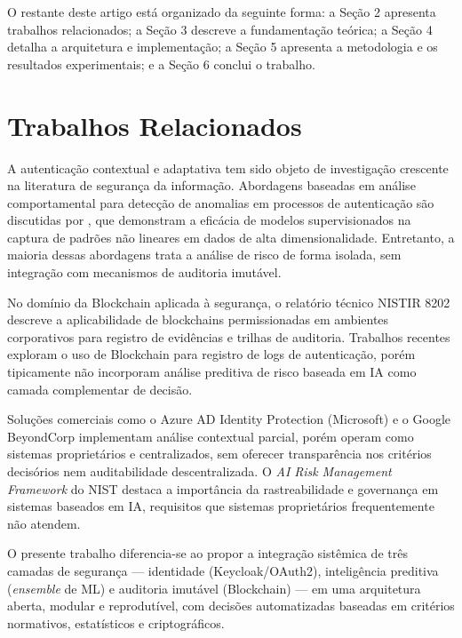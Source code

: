 \documentclass[12pt]{article}
\begin{document}
O restante deste artigo está organizado da seguinte forma: a Seção 2 apresenta trabalhos relacionados; a Seção 3 descreve a fundamentação teórica; a Seção 4 detalha a arquitetura e implementação; a Seção 5 apresenta a metodologia e os resultados experimentais; e a Seção 6 conclui o trabalho.

\section{Trabalhos Relacionados}

A autenticação contextual e adaptativa tem sido objeto de investigação crescente na literatura de segurança da informação. Abordagens baseadas em análise comportamental para detecção de anomalias em processos de autenticação são discutidas por \cite{goodfellow2016}, que demonstram a eficácia de modelos supervisionados na captura de padrões não lineares em dados de alta dimensionalidade. Entretanto, a maioria dessas abordagens trata a análise de risco de forma isolada, sem integração com mecanismos de auditoria imutável.

No domínio da Blockchain aplicada à segurança, o relatório técnico NISTIR 8202 \cite{nist2018blockchain} descreve a aplicabilidade de blockchains permissionadas em ambientes corporativos para registro de evidências e trilhas de auditoria. Trabalhos recentes exploram o uso de Blockchain para registro de logs de autenticação, porém tipicamente não incorporam análise preditiva de risco baseada em IA como camada complementar de decisão.

Soluções comerciais como o Azure AD Identity Protection (Microsoft) e o Google BeyondCorp implementam análise contextual parcial, porém operam como sistemas proprietários e centralizados, sem oferecer transparência nos critérios decisórios nem auditabilidade descentralizada. O \textit{AI Risk Management Framework} do NIST \cite{nist2023ai} destaca a importância da rastreabilidade e governança em sistemas baseados em IA, requisitos que sistemas proprietários frequentemente não atendem.

O presente trabalho diferencia-se ao propor a integração sistêmica de três camadas de segurança --- identidade (Keycloak/OAuth2), inteligência preditiva (\textit{ensemble} de ML) e auditoria imutável (Blockchain) --- em uma arquitetura aberta, modular e reprodutível, com decisões automatizadas baseadas em critérios normativos, estatísticos e criptográficos.
\end{document}
